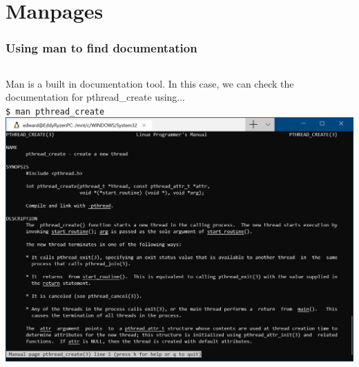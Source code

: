 \documentclass{beamer}
\begin{document}
\section{Manpages}
\begin{frame}
  \frametitle{Using man to find documentation}
  \begin{columns}[c]
      Man is a built in documentation tool. In this case, we can check the documentation for pthread\_create using...\\
      \texttt{\$ man pthread\_create}
      \includegraphics[width=\textwidth,height=\textheight,keepaspectratio]{pthreadmanpage.png}
  \end{columns}
\end{frame}
\end{document}
